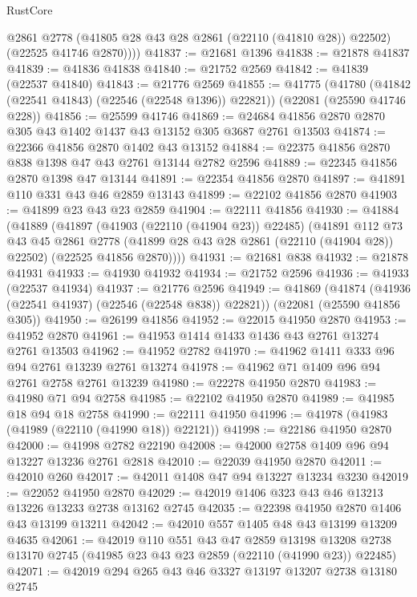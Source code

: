 \begin{lexlean}{RustCore}
\begin{coremodule}
          @2861
          @2778
          (@41805 @28 @43 @28 @2861 (@22110 (@41810 @28)) @22502)
          (@22525 @41746 @2870))))
@41837 := @21681 @1396
@41838 := @21878 @41837
@41839 := @41836 @41838
@41840 := @21752 @2569
@41842 := @41839 (@22537 @41840)
@41843 := @21776 @2569
@41855 := @41775
    (@41780 (@41842 (@22541 @41843) (@22546 (@22548 @1396)) @22821))
    (@22081 (@25590 @41746 @228))
@41856 := @25599 @41746
@41869 := @24684 @41856 @2870 @2870 @305 @43 @1402 @1437 @43 @13152 @305 @3687 @2761 @13503
@41874 := @22366 @41856 @2870 @1402 @43 @13152
@41884 := @22375 @41856 @2870 @838 @1398 @47 @43 @2761 @13144 @2782 @2596
@41889 := @22345 @41856 @2870 @1398 @47 @13144
@41891 := @22354 @41856 @2870
@41897 := @41891 @110 @331 @43 @46 @2859 @13143
@41899 := @22102 @41856 @2870
@41903 := @41899 @23 @43 @23 @2859
@41904 := @22111 @41856
@41930 := @41884
    (@41889
      (@41897
        (@41903 (@22110 (@41904 @23)) @22485)
        (@41891
          @112
          @73
          @43
          @45
          @2861
          @2778
          (@41899 @28 @43 @28 @2861 (@22110 (@41904 @28)) @22502)
          (@22525 @41856 @2870))))
@41931 := @21681 @838
@41932 := @21878 @41931
@41933 := @41930 @41932
@41934 := @21752 @2596
@41936 := @41933 (@22537 @41934)
@41937 := @21776 @2596
@41949 := @41869
    (@41874 (@41936 (@22541 @41937) (@22546 (@22548 @838)) @22821))
    (@22081 (@25590 @41856 @305))
@41950 := @26199 @41856
@41952 := @22015 @41950 @2870
@41953 := @41952 @2870
@41961 := @41953 @1414 @1433 @1436 @43 @2761 @13274 @2761 @13503
@41962 := @41952 @2782
@41970 := @41962 @1411 @333 @96 @94 @2761 @13239 @2761 @13274
@41978 := @41962 @71 @1409 @96 @94 @2761 @2758 @2761 @13239
@41980 := @22278 @41950 @2870
@41983 := @41980 @71 @94 @2758
@41985 := @22102 @41950 @2870
@41989 := @41985 @18 @94 @18 @2758
@41990 := @22111 @41950
@41996 := @41978 (@41983 (@41989 (@22110 (@41990 @18)) @22121))
@41998 := @22186 @41950 @2870
@42000 := @41998 @2782 @22190
@42008 := @42000 @2758 @1409 @96 @94 @13227 @13236 @2761 @2818
@42010 := @22039 @41950 @2870
@42011 := @42010 @260
@42017 := @42011 @1408 @47 @94 @13227 @13234 @3230
@42019 := @22052 @41950 @2870
@42029 := @42019 @1406 @323 @43 @46 @13213 @13226 @13233 @2738 @13162 @2745
@42035 := @22398 @41950 @2870 @1406 @43 @13199 @13211
@42042 := @42010 @557 @1405 @48 @43 @13199 @13209 @4635
@42061 := @42019
    @110
    @551
    @43
    @47
    @2859
    @13198
    @13208
    @2738
    @13170
    @2745
    (@41985 @23 @43 @23 @2859 (@22110 (@41990 @23)) @22485)
@42071 := @42019 @294 @265 @43 @46 @3327 @13197 @13207 @2738 @13180 @2745

\end{coremodule}
\end{lexlean}
